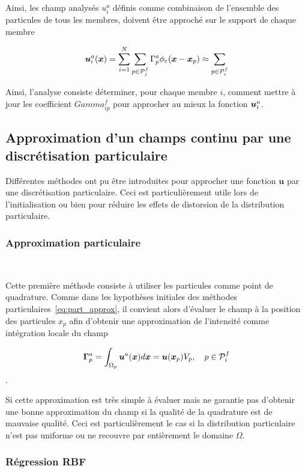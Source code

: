 Ainsi, les champ analysés $u_i^a$ définis comme combinaison de l'ensemble des particules de tous les membres, doivent être approché sur le support de chaque membre

\begin{eqnarray*}
    \bm{u}_i^a(\bm{x}) =  \sum_{i=1}^{N} \sum_{p \in \mathcal{P}_j^f} \Gamma^a_p \phi_{\varepsilon}(\bm{x} - \bm{x}_p)\approx \sum _{p \in \mathcal{P}_i^f}
\end{eqnarray*}

Ainsi, l'analyse consiste déterminer, pour chaque membre $i$, comment mettre à jour les coefficient $Gamma^f_{ip}$ pour approcher au mieux la fonction $\bm{u}_i^a$.

\subsection{Approximation d'un champs continu par une discrétisation particulaire}

Différentes méthodes ont pu être introduites pour approcher une fonction $\bm u$ par une discrétisation particulaire. Ceci est particulièrement utile lors de l'initialisation ou bien pour réduire les effets de distorsion de la distribution particulaire.

\subsubsection{Approximation particulaire}~\label{sec:approx_part}

Cette première méthode consiste à utiliser les particules comme point de quadrature. Comme dans les hypothèses initiales des méthodes particulaires~\eqref{eq:part_approx}, il convient alors d'évaluer le champ à la position des particules $x_p$ afin d'obtenir une approximation de l'intensité comme intégration locale du champ

\begin{equation*}
    \bm \Gamma^a_p = \int_{\Omega_p} \bm u^a(\bm{x}) d\bm{x} = \bm u(\bm{x}_p) V_p, \quad p \in \mathcal P^f_i
\end{equation*}.

Si cette approximation est très simple à évaluer mais ne garantie pas d'obtenir une bonne approximation du champ si la qualité de la quadrature est de mauvaise qualité. Ceci est particulièrement le cas si la distribution particulaire n'est pas uniforme ou ne recouvre par entièrement le domaine $\Omega$.

\subsubsection{Régression RBF}

